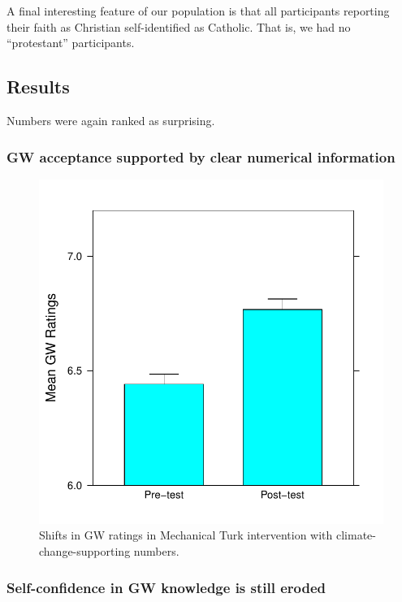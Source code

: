 A final interesting feature of our population is that all participants reporting
their faith as Christian self-identified as Catholic. That is, we had no
“protestant” participants.

\subsection{Results}

Numbers were again ranked as surprising.

\subsubsection{GW acceptance supported by clear numerical information}

\begin{figure}
    \centering
    \includegraphics{CCO-prondi-gw.pdf}
    \caption{Shifts in GW ratings in Mechanical Turk intervention with
        climate-change-supporting numbers.}
    \label{fig:prondi-gw}
\end{figure}

\subsubsection{Self-confidence in GW knowledge is still eroded}

